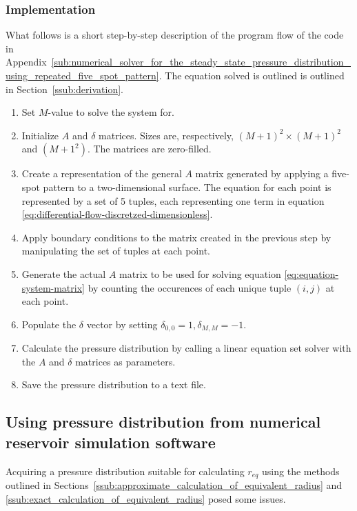\subsubsection{Implementation} %
\label{ssub:implementation}
What follows is a short step-by-step description of the program flow of the code in Appendix~\ref{sub:numerical_solver_for_the_steady_state_pressure_distribution_using_repeated_five_spot_pattern}. The equation solved is outlined is outlined in Section~\ref{ssub:derivation}.
\begin{enumerate}
    \item Set $M$-value to solve the system for.
    \item Initialize $A$ and $\delta$ matrices. Sizes are, respectively, $(M+1)^2 \times (M+1)^2$ and $(M+1^2)$. The matrices are zero-filled.
    \item Create a representation of the general $A$ matrix generated by applying a five-spot pattern to a two-dimensional surface. The equation for each point is represented by a set of 5 tuples, each representing one term in equation \eqref{eq:differential-flow-discretzed-dimensionless}.
    \item Apply boundary conditions to the matrix created in the previous step by manipulating the set of tuples at each point.
    \item Generate the actual $A$ matrix to be used for solving equation \eqref{eq:equation-system-matrix} by counting the occurences of each unique tuple $(i,j)$ at each point.
    \item Populate the $\delta$ vector by setting $\delta_{0,0}=1,\delta_{M,M}=-1$.
    \item Calculate the pressure distribution by calling a linear equation set solver with the $A$ and $\delta$ matrices as parameters.
    \item Save the pressure distribution to a text file.
\end{enumerate}


\subsection{Using pressure distribution from numerical reservoir simulation software} %
\label{sub:using_pressure_distribution_from_numerical_reservoir_simulation_software}
Acquiring a pressure distribution suitable for calculating $r_{eq}$ using the methods outlined in Sections~\ref{ssub:approximate_calculation_of_equivalent_radius} and \ref{ssub:exact_calculation_of_equivalent_radius} posed some issues.

